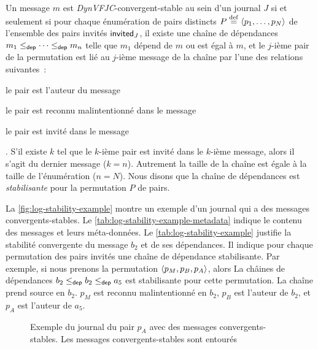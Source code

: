 Un message $m$ est \emph{DynVFJC}-convergent-stable au sein d'un journal $J$ si et seulement si pour chaque énumération de pairs distincts $P \defeq \tuple{p_1, \dotsc, p_N}$ de l'ensemble des pairs invités $\trm{invited}_J$, il existe une chaîne de dépendances $m_1 \depeq \dotsb \depeq m_n$ telle que $m_1$ dépend de $m$ ou est égal à $m$, et le $j$-ième pair de la permutation est lié au $j$-ième message de la chaîne par l'une des relations suivantes~: \begin{inlinelist}
    \item le pair est l'auteur du message
    \item le pair est reconnu malintentionné dans le message
    \item le pair est invité dans le message
\end{inlinelist}.
S'il existe $k$ tel que le $k$-ième pair est invité dans le $k$-ième message, alors il s'agit du dernier message ($k = n$).
Autrement la taille de la chaîne est égale à la taille de l'énumération ($n = N$).
Nous disons que la chaîne de dépendances est \emph{stabilisante} pour la permutation $P$ de pairs.

La \autoref{fig:log-stability-example} montre un exemple d'un journal qui a des messages convergents-stables.
Le \autoref{tab:log-stability-example-metadata} indique le contenu des messages et leurs méta-données.
Le \autoref{tab:log-stability-example} justifie la stabilité convergente du message $b_2$ et de ses dépendances.
Il indique pour chaque permutation des pairs invités une chaîne de dépendance stabilisante.
Par exemple, si nous prenons la permutation $\tuple*{p_M, p_B, p_A}$, alors La châines de dépendances $b_2 \depeq b_2 \depeq a_5$ est stabilisante pour cette permutation.
La chaîne prend source en $b_2$.
$p_M$ est reconnu malintentionné en $b_2$, $p_B$ est l'auteur de $b_2$, et $p_A$ est l'auteur de $a_5$.


\begin{figure}[hbt]
\centering
{}
\caption[Journal du pair $p_A$ avec des messages convergents-stables]{Exemple du journal du pair $p_A$ avec des messages convergents-stables.
Les messages convergents-stables sont entourés}\label{fig:log-stability-example}
\end{figure}


